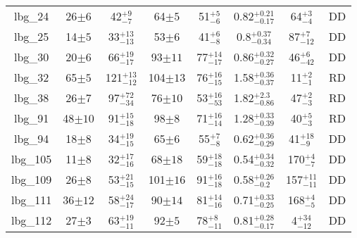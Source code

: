 \documentclass[fleqn,usenatbib]{mn2e}
\begin{document}
\begin{table*}
\begin{threeparttable}
\begin{tabular}{cccccccc}
lbg\_24         & 26$\pm6$                    & 42$^{+9}_{-7}$                     & 64$\pm5$                  & 51$^{+5}_{-6}$           & 0.82$^{+0.21}_{-0.17}$          & 64$^{+3}_{-4}$ & DD   \\
lbg\_25         & 14$\pm5$                    & 33$^{+13}_{-13}$                     & 53$\pm6$                  & 41$^{+6}_{-8}$         & 0.8$^{+0.37}_{-0.34}$                  & 87$^{+7}_{-12}$  & DD   \\
lbg\_30         & 20$\pm6$                    & 66$^{+19}_{-17}$                    & 93$\pm11$                 & 77$^{+14}_{-17}$       & 0.86$^{+0.32}_{-0.27}$               & 46$^{+6}_{-42}$ & DD \\
lbg\_32         & 65$\pm5$                    & 121$^{+13}_{-12}$                    & 104$\pm13$                 & 76$^{+16}_{-15}$       & 1.58$^{+0.36}_{-0.37}$               & 11$^{+2}_{-1}$ & RD \\
lbg\_38         & 26$\pm7$                    & 97$^{+72}_{-34}$                     & 76$\pm10$                  & 53$^{+16}_{-53}$       & 1.82$^{+2.3}_{-0.86}$               & 47$^{+2}_{-3}$  & RD   \\
lbg\_91         & 48$\pm10$                    & 91$^{+15}_{-18}$                     & 98$\pm8$                  & 71$^{+16}_{-14}$        & 1.28$^{+0.33}_{-0.39}$              & 40$^{+5}_{-3}$  & RD  \\
lbg\_94         & 18$\pm8$                    & 34$^{+19}_{-15}$                     & 65$\pm6$                  & 55$^{+7}_{-8}$         & 0.62$^{+0.36}_{-0.29}$                & 41$^{+18}_{-9}$  & DD  \\
lbg\_105        & 11$\pm8$                    & 32$^{+17}_{-16}$                     & 68$\pm18$                  & 59$^{+18}_{-18}$        & 0.54$^{+0.34}_{-0.32}$                & 170$^{+4}_{-7}$ & DD  \\
lbg\_109        & 26$\pm8$                    & 53$^{+21}_{-15}$                     & 101$\pm16$                 & 91$^{+16}_{-18}$      & 0.58$^{+0.26}_{-0.2}$                & 157$^{+11}_{-11}$ & DD  \\
lbg\_111        & 36$\pm12$         & 58$^{+24}_{-17}$                     & 90$\pm14$                  & 81$^{+14}_{-16}$                   & 0.71$^{+0.33}_{-0.25}$                 & 168$^{+4}_{-5}$ & DD  \\
lbg\_112         & 27$\pm3$                    & 63$^{+19}_{-11}$                    & 92$\pm5$                 & 78$^{+8}_{-11}$       & 0.81$^{+0.28}_{-0.17}$               & 4$^{+34}_{-12}$ & DD \\

\end{tabular}
\end{threeparttable}
\end{table*}
\end{document}
